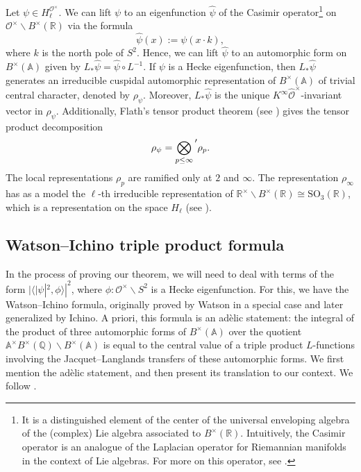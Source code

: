 \documentclass[11pt]{amsart}
\theoremstyle{definition}
\begin{document}
Let $\psi \in H_{\ell}^{\mathcal{O}^{\times}}$. We can lift $\psi$ to an eigenfunction $\widehat{\psi}$ of the Casimir operator\footnote{It is a distinguished element of the center of the universal enveloping algebra of the (complex) Lie algebra associated to $B^{\times}(\mathbb{R})$. Intuitively, the Casimir operator is an analogue of the Laplacian operator for Riemannian manifolds in the context of Lie algebras. For more on this operator, see \cite[\S 10.2]{HallLieStuff}.} on $\mathcal{O}^{\times} \backslash B^{\times}(\mathbb{R})$ via the formula $$ \widehat{\psi}(x) := \psi(x\cdot k),$$ where $k$ is the north pole of $S^2$. Hence, we can lift $\widehat{\psi}$ to an automorphic form on $B^{\times}(\mathbb{A})$ given by $L_{*} \widehat{\psi} = \widehat{\psi} \circ L^{-1}$. If $\psi$ is a Hecke eigenfunction, then $L_{*} \widehat{\psi}$ generates an irreducible cuspidal automorphic representation of $B^{\times}(\mathbb{A})$ of trivial central character, denoted by $\rho_{\psi}$. Moreover, $L_{*} \widehat{\psi}$ is the unique $K^{\infty} \widehat{\mathcal{O}}^{\times}$-invariant vector in $\rho_{\psi}$. Additionally, Flath's tensor product theorem (see \cite[Thm.~6.3.4]{AutRepGetz}) gives the tensor product decomposition 
\begin{equation}
    \rho_{\psi} = \bigotimes_{p\leq \infty} {\vphantom{\sum}}' \rho_{p}. \label{Flath}
\end{equation}
The local representations $\rho_p$ are ramified only at $2$ and $\infty$. The representation $\rho_{\infty}$ has as a model the $\ell$-th irreducible representation of $\mathbb{R}^{\times} \backslash B^{\times}(\mathbb{R}) \cong \mathrm{SO}_3(\mathbb{R})$, which is a representation on the space $H_\ell$ (see \cite[Thm.~17.12]{QuantumTheoryforMath}).









\subsection{Watson--Ichino triple product formula}

In the process of proving our theorem, we will need to deal with terms of the form $|\langle |\psi|^2, \phi\rangle |^2$, where $\phi:\mathcal{O}^{\times} \backslash S^2$ is a Hecke eigenfunction. For this, we have the Watson--Ichino formula, originally proved by Watson in a special case and later generalized by Ichino. A priori, this formula is an adèlic statement: the integral of the product of three automorphic forms of $B^{\times}(\mathbb{A})$ over the quotient $\mathbb{A}^{\times} B^{\times}(\mathbb{Q}) \backslash B^{\times}(\mathbb{A})$ is equal to the central value of a triple product $L$-functions involving the Jacquet--Langlands transfers of these automorphic forms. We first mention the adèlic statement, and then present its translation to our context. We follow \cite[\S 4]{HumphriesKhan}.
\end{document}
